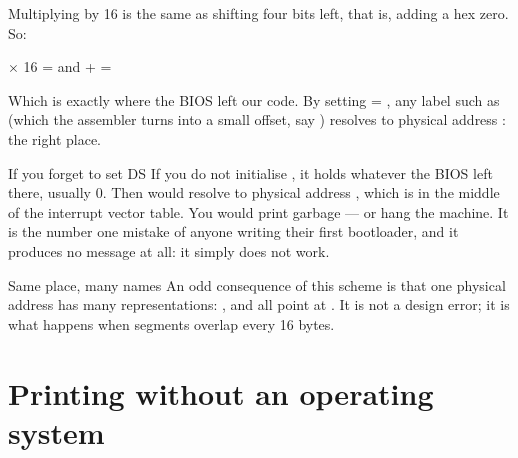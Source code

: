 \begin{center}
\end{center}

Multiplying by 16 is the same as shifting four bits left, that is, adding a hex zero. So:

\begin{center}
 $\times$ 16 =  \qquad and \qquad {} +  = 
\end{center}

Which is exactly where the BIOS left our code. By setting  = , any label such as
 (which the assembler turns into a small offset, say ) resolves to
physical address : the right place.

\begin{danger}{If you forget to set DS}
If you do not initialise , it holds whatever the BIOS left there, usually 0. Then
 would resolve to physical address , which is in the middle of the
interrupt vector table. You would print garbage --- or hang the machine. It is the number one
mistake of anyone writing their first bootloader, and it produces no message at all: it simply does
not work.
\end{danger}

\begin{warn}{Same place, many names}
An odd consequence of this scheme is that one physical address has many representations:
,  and  all point at . It is not a design
error; it is what happens when segments overlap every 16 bytes.
\end{warn}

\section{Printing without an operating system}

